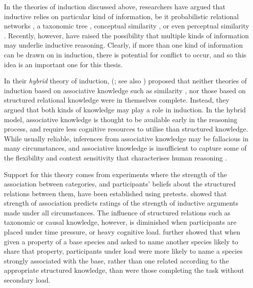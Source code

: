 In the theories of induction discussed above,
researchers have argued that inductive relies on particular kind of information,
be it probabilistic relational networks \citep{Kemp2009},
a taxonomic tree \citep{Osherson1990},
conceptual similarity \citep{Sloman1993},
or even perceptual similarity \citep{Sloutsky2007}.
Recently, however, \citet{Bright2014a} have raised the possibility
that multiple kinds of information may underlie inductive reasoning.
Clearly, if more than one kind of information can be drawn on in induction,
there is potential for conflict to occur,
and so this idea is an important one for this thesis.

In their \emph{hybrid} theory of induction,
\citeauthor{Bright2014a} (\citeyear{Bright2014a}; see also \citealp{Crisp-Bright2010})
proposed that neither theories of induction based on associative knowledge
such as similarity \citep{Sloman1993},
nor those based on structured relational knowledge
\citep[e.g.][]{Osherson1990,Kemp2009} were in themselves complete.
Instead, they argued that both kinds of knowledge may play a role in induction.
In the hybrid model,
associative knowledge is thought to be
available early in the reasoning process,
and require less cognitive resources to utilise than structured knowledge.
While usually reliable, inferences from associative knowledge
may be fallacious in many circumstances,
and associative knowledge is insufficient to capture
some of the flexibility and context sensitivity that characterises human reasoning
\citep{Murphy1985,Heit1994}.

Support for this theory comes from experiments
where the strength of the association between categories,
and participants' beliefs about the structured relations between them,
have been established using pretests.
\citet{Bright2014a}
showed that strength of association predicts
ratings of the strength of inductive arguments made under all circumstances.
The influence of structured relations such as taxonomic or causal knowledge, however,
is diminished when participants are placed under time pressure, or heavy cognitive load.
\citet{Bright2014a}
further showed that when given a property of a base species
and asked to name another species likely to share that property,
participants under load were more likely to
name a species strongly associated with the base,
rather than one related according to the appropriate structured knowledge,
than were those completing the task without secondary load.

